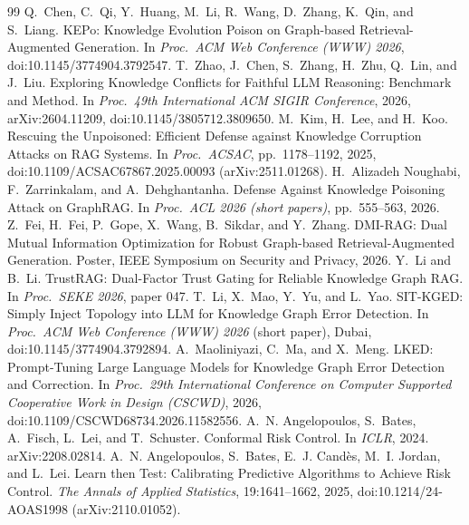 \documentclass[preprint,12pt]{elsarticle}
\begin{document}
\begin{thebibliography}{99}
 Q.~Chen, C.~Qi, Y.~Huang, M.~Li, R.~Wang, D.~Zhang, K.~Qin, and S.~Liang. KEPo: Knowledge Evolution Poison on Graph-based Retrieval-Augmented Generation. In \emph{Proc.\ ACM Web Conference (WWW) 2026}, doi:10.1145/3774904.3792547.
 T.~Zhao, J.~Chen, S.~Zhang, H.~Zhu, Q.~Lin, and J.~Liu. Exploring Knowledge Conflicts for Faithful LLM Reasoning: Benchmark and Method. In \emph{Proc.\ 49th International ACM SIGIR Conference}, 2026, arXiv:2604.11209, doi:10.1145/3805712.3809650.
 M.~Kim, H.~Lee, and H.~Koo. Rescuing the Unpoisoned: Efficient Defense against Knowledge Corruption Attacks on RAG Systems. In \emph{Proc.\ ACSAC}, pp.~1178--1192, 2025, doi:10.1109/ACSAC67867.2025.00093 (arXiv:2511.01268).
 H.~Alizadeh Noughabi, F.~Zarrinkalam, and A.~Dehghantanha. Defense Against Knowledge Poisoning Attack on GraphRAG. In \emph{Proc.\ ACL 2026 (short papers)}, pp.~555--563, 2026.
 Z.~Fei, H.~Fei, P.~Gope, X.~Wang, B.~Sikdar, and Y.~Zhang. DMI-RAG: Dual Mutual Information Optimization for Robust Graph-based Retrieval-Augmented Generation. Poster, IEEE Symposium on Security and Privacy, 2026.
 Y.~Li and B.~Li. TrustRAG: Dual-Factor Trust Gating for Reliable Knowledge Graph RAG. In \emph{Proc.\ SEKE 2026}, paper 047.
 T.~Li, X.~Mao, Y.~Yu, and L.~Yao. SIT-KGED: Simply Inject Topology into LLM for Knowledge Graph Error Detection. In \emph{Proc.\ ACM Web Conference (WWW) 2026} (short paper), Dubai, doi:10.1145/3774904.3792894.
 A.~Maoliniyazi, C.~Ma, and X.~Meng. LKED: Prompt-Tuning Large Language Models for Knowledge Graph Error Detection and Correction. In \emph{Proc.\ 29th International Conference on Computer Supported Cooperative Work in Design (CSCWD)}, 2026, doi:10.1109/CSCWD68734.2026.11582556.
 A.~N. Angelopoulos, S.~Bates, A.~Fisch, L.~Lei, and T.~Schuster. Conformal Risk Control. In \emph{ICLR}, 2024. arXiv:2208.02814.
 A.~N. Angelopoulos, S.~Bates, E.~J. Cand\`es, M.~I. Jordan, and L.~Lei. Learn then Test: Calibrating Predictive Algorithms to Achieve Risk Control. \emph{The Annals of Applied Statistics}, 19:1641--1662, 2025, doi:10.1214/24-AOAS1998 (arXiv:2110.01052).
\end{thebibliography}

\appendix
\end{document}
